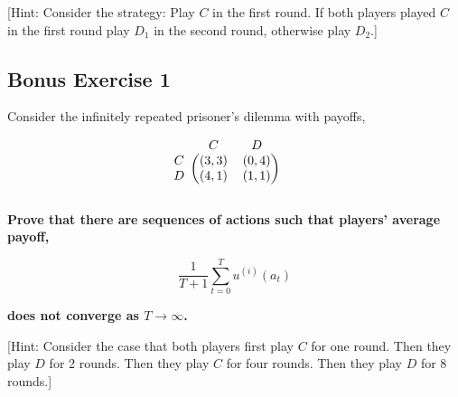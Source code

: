 \documentclass[10pt]{article}
\begin{document}
[Hint: Consider the strategy: Play \(C\) in the first round. If both players
played \(C\) in the first round play \(D_1\) in the second round, otherwise play
\(D_2\).]

\subsection*{Bonus Exercise 1}

Consider the infinitely repeated prisoner's dilemma with payoffs,

\begin{equation*}
    \begin{blockarray}{ccc}
        & C & D \\
        \begin{block}{c(cc)}
            C & (3, 3) & (0, 4) \\
            D & (4, 1) & (1, 1) \\
        \end{block}
    \end{blockarray}\qquad
\end{equation*}


\textbf{Prove that there are sequences of actions such that players' average payoff,}

\[\frac{1}{T+1} \sum\limits_{t=0}^{T} u^{(i)}(a_t)\]

\textbf{does not converge as \(T \rightarrow \infty\).}

[Hint: Consider the case that both players first play \(C\) for one round. Then they
play \(D\) for 2 rounds. Then they play \(C\) for four rounds. Then they play
\(D\) for 8 rounds.]
\end{document}
